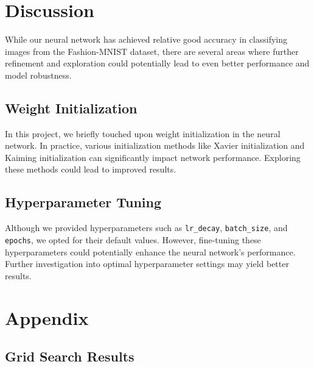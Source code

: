 \documentclass[10pt,a4paper,twoside]{tau}
\begin{document}
\section{Discussion}

While our neural network has achieved relative good accuracy in classifying images from the Fashion-MNIST dataset, there are several areas where further refinement and exploration could potentially lead to even better performance and model robustness.

\subsection{Weight Initialization}

In this project, we briefly touched upon weight initialization in the neural network. In practice, various initialization methods like Xavier initialization and Kaiming initialization can significantly impact network performance. Exploring these methods could lead to improved results.

\subsection{Hyperparameter Tuning}

Although we provided hyperparameters such as \texttt{lr\_decay}, \texttt{batch\_size}, and \texttt{epochs}, we opted for their default values. However, fine-tuning these hyperparameters could potentially enhance the neural network's performance. Further investigation into optimal hyperparameter settings may yield better results.

\renewcommand{\thesubsection}{\Alph{subsection}} 
\newpage

\section{Appendix}

\subsection{Grid Search Results} \label{subsec:grid-table}
\end{document}
